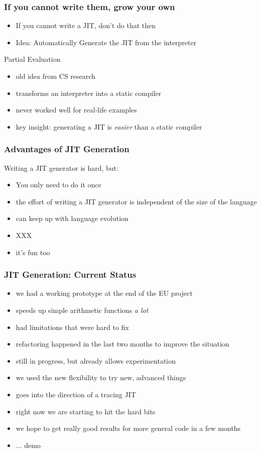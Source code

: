 \documentclass[utf8x]{beamer}
\begin{document}
\begin{frame}
  \frametitle{If you cannot write them, grow your own}
  \begin{itemize}
  \item If you cannot write a JIT, don't do that then
  \pause
  \item Idea: Automatically Generate the JIT from the interpreter
  \pause
  \end{itemize}
  \begin{block}{
    Partial Evaluation}
    \begin{itemize}
    \item old idea from CS research
    \item transforms an interpreter into a static compiler
    \item never worked well for real-life examples
    \item key insight: generating a JIT is \emph{easier} than a static compiler
    \end{itemize}
  \end{block}
 
\end{frame}

\begin{frame}
  \frametitle{Advantages of JIT Generation}
  Writing a JIT generator is hard, but:
  \begin{itemize}
  \item You only need to do it once
  \item the effort of writing a JIT generator is independent of the size of the language
  \item can keep up with language evolution
  \item XXX
  \item it's fun too
  \end{itemize}
\end{frame}

\begin{frame}
  \frametitle{JIT Generation: Current Status}
  \begin{itemize}
  \item we had a working prototype at the end of the EU project
  \item speeds up simple arithmetic functions \emph{a lot}
  \item had limitations that were hard to fix
  \pause
  \item refactoring happened in the last two months to improve the situation
  \item still in progress, but already allows experimentation
  \item we used the new flexibility to try new, advanced things
  \item goes into the direction of a tracing JIT
  \item right now we are starting to hit the hard bits
  \item we hope to get really good results for more general code in a few months
  \item ... demo
  \end{itemize}
\end{frame}
\end{document}
